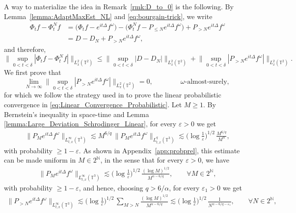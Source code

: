 \documentclass[11pt, xcolor = dvipsnames,reqno
]{amsart}
\theoremstyle{definition}
\theoremstyle{remark}
\begin{document}
A way to materialize the idea in Remark~\ref{rmk:D_to_0} is the following. 
By Lemma~\ref{lemma:AdaptMaxEst_NL} and \eqref{eq:bourgain-trick}, we write 
\begin{align}
    \Phi_t f - \Phi^N_t f
    & = \big(\Phi_t f - e^{it\Delta} f^\omega \big) 
    - \big( \Phi^N_t f - P_{\leq N} e^{it\Delta} f^\omega \big) 
    + P_{> N} e^{it\Delta} f^\omega \\
    & = D - D_N + P_{> N} e^{it\Delta} f^\omega, 
\end{align}
and therefore, 
\begin{equation}
    \Big\| \sup_{0 < t < \delta} 
		| \Phi_t f   - \Phi^N_t f  | \Big\|_{L^2_x(\mathbb{T}^2)}
        \leq 
        \Big\| \sup_{0 < t < \delta} 
		| D - D_N  | \Big\|_{L^2_x(\mathbb{T}^2)}
        + \Big\| \sup_{0 < t < \delta} 
		| P_{> N} e^{it\Delta} f^\omega | \Big\|_{L^2_x(\mathbb{T}^2)}.
\end{equation}
We first prove that
\begin{equation}\label{eq:Limit_Linear_Term}
    \lim_{N \to \infty} \Big\| \sup_{0 < t < \delta} 
		| P_{> N} e^{it\Delta} f^\omega | \Big\|_{L^2_x(\mathbb{T}^2)} = 0,
        \qquad \qquad \omega\text{-almost-surely, }
\end{equation}
for which we follow the strategy used in \cite{CLS2020} to prove the linear probabilistic convergence in \eqref{eq:Linear_Convergence_Probabilistic}.
Let $M \geq 1$.
By Bernstein's inequality in space-time and Lemma \ref{lemma:Large_Deviation_Schrodinger_Linear}, for every $\varepsilon > 0$ we get
\begin{align}
    \|P_M e^{i t \Delta} f^{\omega}\|_{L^{\infty}_{t,x}(\mathbb{T}^3)} \lesssim M^{6/q} \,  \|P_M e^{i t \Delta} f^{\omega}\|_{L^q_{t,x}(\mathbb{T}^3)}
    \lesssim 
    \Big(  \log \frac{1}{\varepsilon} \Big)^{1/2} \,  \frac{M^{6/q}}{M^{\alpha}},
\end{align}
with probability $\geq 1-\varepsilon$. As shown in Appendix~\ref{app:probprel}, this estimate can be made uniform in $M \in 2^{\mathbb N}$, in the sense that for every $\varepsilon > 0$, we have  
\begin{align}
    \|P_M e^{i t \Delta} f^{\omega}\|_{L^{\infty}_{t,x}(\mathbb{T}^3)} 
    \lesssim 
    \Big(  \log \frac{1}{\varepsilon} \Big)^{1/2} \,  \frac{(\log M)^{1/2}}{M^{\alpha - 6/q}}, \qquad \forall M \in 2^{\mathbb N}, 
\end{align}
with probability $\geq 1 - \varepsilon$, and hence, choosing $q > 6/\alpha$, for every $\varepsilon_1 > 0$ we get
\begin{align}
    \|P_{> N} e^{i t \Delta} f^{\omega}\|_{L^{\infty}_{t,x}(\mathbb{T}^3)} 
    \lesssim 
    \Big(  \log \frac{1}{\varepsilon} \Big)^{1/2} \,  \sum_{M > N}\frac{(\log M)^{1/2}}{M^{\alpha - 6/q}}
    \lesssim 
    \Big(  \log \frac{1}{\varepsilon} \Big)^{1/2} \,  \frac{1}{N^{\alpha - 6/q - \varepsilon_1}}, 
    \qquad \forall N \in 2^{\mathbb N}, 
\end{align}
\end{document}

